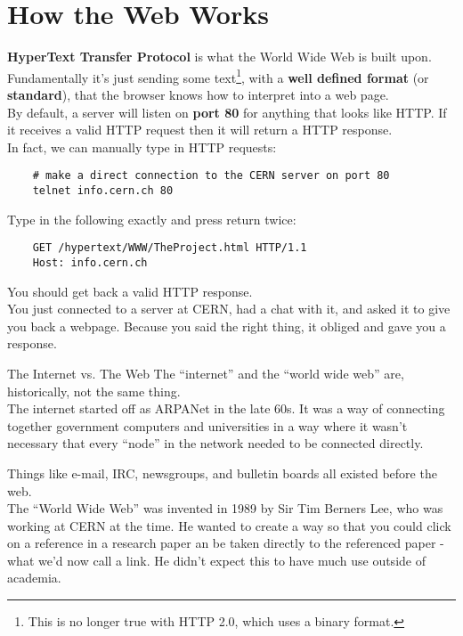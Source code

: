 \section{How the Web Works}

\textbf{HyperText Transfer Protocol} is what the World Wide Web is built upon.
\\

Fundamentally it's just sending some text\footnote{This is no longer true with HTTP 2.0, which uses a binary format.}, with a \textbf{well defined format} (or \textbf{standard}), that the browser knows how to interpret into a web page.
\\

By default, a server will listen on \textbf{port 80} for anything that looks like HTTP. If it receives a valid HTTP request then it will return a HTTP response.
\\

In fact, we can manually type in HTTP requests:

\begin{verbatim}
    # make a direct connection to the CERN server on port 80
    telnet info.cern.ch 80
\end{verbatim}

Type in the following exactly and press return twice:

\begin{verbatim}
    GET /hypertext/WWW/TheProject.html HTTP/1.1
    Host: info.cern.ch
\end{verbatim}

You should get back a valid HTTP response.
\\

You just connected to a server at CERN, had a chat with it, and asked it to give you back a webpage. Because you said the right thing, it obliged and gave you a response.

\begin{infobox}{The Internet vs. The Web}
    The ``internet'' and the ``world wide web'' are, historically, not the same thing.
    \\

    The internet started off as ARPANet in the late 60s. It was a way of connecting together government computers and universities in a way where it wasn't necessary that every ``node'' in the network needed to be connected directly.
    \\


    Things like e-mail, IRC, newsgroups, and bulletin boards all existed before the web.
    \\

    The ``World Wide Web'' was invented in 1989 by Sir Tim Berners Lee, who was working at CERN at the time. He wanted to create a way so that you could click on a reference in a research paper an be taken directly to the referenced paper - what we'd now call a link. He didn't expect this to have much use outside of academia.
\end{infobox}


